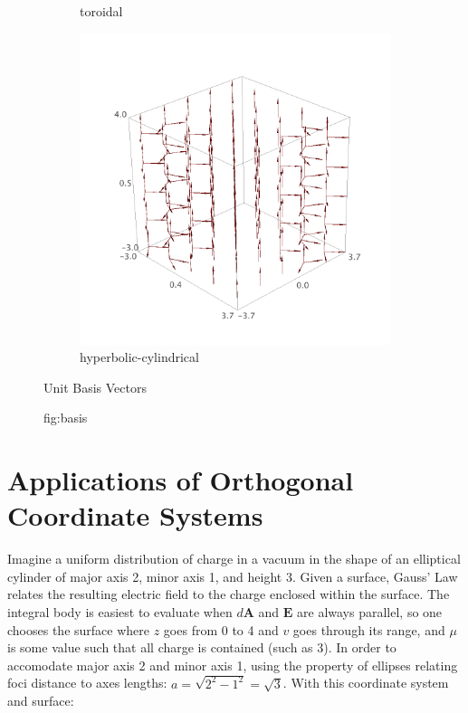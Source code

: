 \documentclass{article}
\begin{document}
\begin{figure}
\begin{subfigure}[b]{0.3\textwidth}
        \caption{toroidal}
    \end{subfigure}
    \begin{subfigure}[b]{0.3\textwidth}
        \includegraphics[width=\textwidth]{images/hyperbolic_bases.png}
        \caption{hyperbolic-cylindrical}
    \end{subfigure}
\caption{Unit Basis Vectors}
\caption{fig:basis}
\end{figure}


\section*{Applications of Orthogonal Coordinate Systems}
\label{sec:convenient}

Imagine a uniform distribution of charge in a vacuum in the shape of an elliptical cylinder of major axis 2, minor axis 1, and height 3. Given a surface, Gauss' Law relates the resulting electric field to the charge enclosed within the surface. The integral body is easiest to evaluate when $d \textbf{A}$ and $\textbf{E}$ are always parallel, so one chooses the surface where $z$ goes from 0 to 4 and $v$ goes through its range, and $\mu$ is some value such that all charge is contained (such as 3). In order to accomodate major axis 2 and minor axis 1, using the property of ellipses relating foci distance to axes lengths: $a = \sqrt{2^2 - 1^2} = \sqrt{3}$. With this coordinate system and surface:
\end{document}
